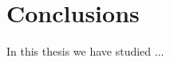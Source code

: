 \documentclass[../thesis.tex]{subfiles}
\begin{document}
\chapter{Conclusions}

In this thesis we have studied ...
\end{document}
